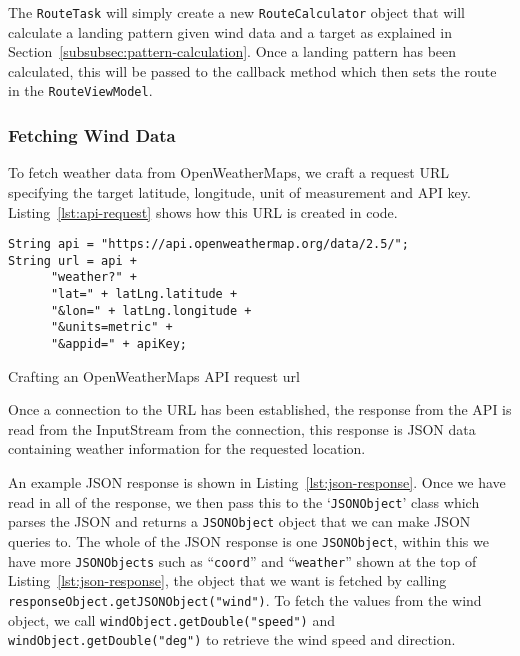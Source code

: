The \texttt{RouteTask} will simply create a new \texttt{RouteCalculator} object that will calculate a landing pattern given wind data and a target as explained in Section~\vref{subsubsec:pattern-calculation}. Once a landing pattern has been calculated, this will be passed to the callback method which then sets the route in the \texttt{RouteViewModel}.

\subsubsection{Fetching Wind Data}\label{subsubsec:fetching-wind-data}
To fetch weather data from OpenWeatherMaps, we craft a request URL specifying the target latitude, longitude, unit of measurement and API key. Listing~\vref{lst:api-request} shows how this URL is created in code.

\begin{listing}
  \centering
  \begin{verbatim}
String api = "https://api.openweathermap.org/data/2.5/";
String url = api +
      "weather?" +
      "lat=" + latLng.latitude +
      "&lon=" + latLng.longitude +
      "&units=metric" +
      "&appid=" + apiKey;
  \end{verbatim}
  \caption{Crafting an OpenWeatherMaps API request url}\label{lst:api-request}
\end{listing}

Once a connection to the URL has been established, the response from the API is read from the InputStream from the connection, this response is JSON data containing weather information for the requested location.

An example JSON response is shown in Listing~\ref{lst:json-response}. Once we have read in all of the response, we then pass this to the `\texttt{JSONObject}' class which parses the JSON and returns a \texttt{JSONObject} object that we can make JSON queries to. The whole of the JSON response is one \texttt{JSONObject}, within this we have more \texttt{JSONObjects} such as ``\texttt{coord}'' and ``\texttt{weather}'' shown at the top of Listing~\ref{lst:json-response}, the object that we want is fetched by calling \texttt{responseObject.getJSONObject("wind")}. To fetch the values from the wind object, we call \texttt{windObject.getDouble("speed")} and \texttt{windObject.getDouble("deg")} to retrieve the wind speed and direction.

